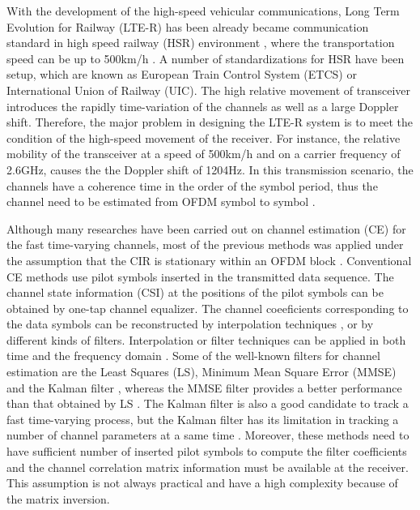 \documentclass[12pt,journal,draftclsnofoot,onecolumn]{IEEEtran}
\begin{document}
With the development of the high-speed vehicular communications, Long Term Evolution for Railway (LTE-R) has been already became communication standard in high speed railway (HSR) environment \cite{Luo2012,Fokum2010}, where the transportation speed can be up to 500km/h \cite{Banerjee2016}. A number of standardizations for HSR have been setup, which are known as European Train Control System (ETCS) or International Union of Railway (UIC). The high relative movement of transceiver introduces the  rapidly time-variation of the channels as well as a large Doppler shift. Therefore, the major problem in designing the LTE-R system is to meet the condition of the high-speed movement of the receiver. For instance, the relative mobility of the transceiver at a speed of 500km/h and on a carrier frequency of 2.6GHz, causes the the Doppler shift of 1204Hz. In this transmission scenario, the channels have a coherence time in the order of the symbol period,  thus the channel need to be estimated from OFDM symbol to symbol \cite{Barhumi2005}.

Although many researches have been carried out on channel estimation (CE) for the fast time-varying channels, most of the previous methods was applied under the assumption that the CIR is stationary within an OFDM block \cite {Hu2003, Tang2007, Park2005}. Conventional CE methods use pilot symbols inserted in the transmitted data sequence. The channel state information (CSI) at the positions of the pilot symbols can be obtained by one-tap channel equalizer. The channel coeeficients corresponding to the data symbols can be reconstructed by interpolation techniques \cite{Cavers1991, Lau1994}, or by different kinds of filters. Interpolation or filter techniques can be applied in both time and the frequency domain \cite{Mostofi2005,Hijazi2009,Simko2011}. Some of the well-known filters for channel estimation are the  Least Squares (LS), Minimum Mean Square Error (MMSE)  \cite{Mostofi2005,Hijazi2009,Simko2011} and the Kalman filter \cite{Kaufman1983}, whereas the MMSE filter provides a better performance than that obtained by LS \cite{Edfors1998}. The Kalman filter is also a good candidate to track a fast time-varying process, but the Kalman filter has its limitation in tracking a number of channel parameters at a same time \cite{Kaufman1983}. Moreover, these methods need to have sufficient number of inserted pilot symbols to compute the filter coefficients and the channel correlation matrix information must be available at the receiver. This assumption is not always practical and have a high complexity because of the matrix inversion. 
\end{document}
